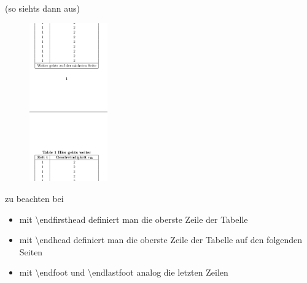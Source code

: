 \begin{frame}[fragile]{(so siehts dann aus)}
\begin{figure}
 \includegraphics[width=0.3\textwidth]{images/longtable_v2.png}
\end{figure}

\end{frame}

\begin{frame}[fragile]{zu beachten bei }
\begin{itemize}
\item mit \textbackslash endfirsthead definiert man die oberste Zeile der Tabelle 
\item mit \textbackslash endhead definiert man die oberste Zeile der Tabelle auf den folgenden Seiten
\item mit \textbackslash endfoot und \textbackslash endlastfoot analog die letzten Zeilen
\end{itemize}
\end{frame}

